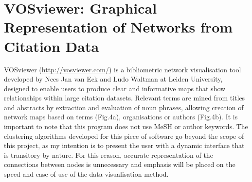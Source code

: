 \documentclass[PROP_AGutteridge_CS.tex]{subfiles}
\begin{document}
\section{VOSviewer: Graphical Representation of Networks from Citation Data}
VOSviewer (\url{http://vosviewer.com/}) is a bibliometric network visualisation tool developed by Nees Jan van Eck and Ludo Waltman at Leiden University, designed to enable users to produce clear and informative maps that show relationships within large citation datasets\cite{eck-waltman2}. Relevant terms are mined from titles and abstracts by extraction and evaluation of noun phrases\cite{eck-waltman1}, allowing creation of network maps based on terms (Fig.4a), organisations or authors (Fig.4b). It is important to note that this program does not use MeSH or author keywords. The clustering algorithms developed for this piece of software go beyond the scope of this project, as my intention is to present the user with a dynamic interface that is transitory by nature. For this reason, accurate representation of the connections between nodes is unnecessary and emphasis will be placed on the speed and ease of use of the data visualisation method.
\end{document}
